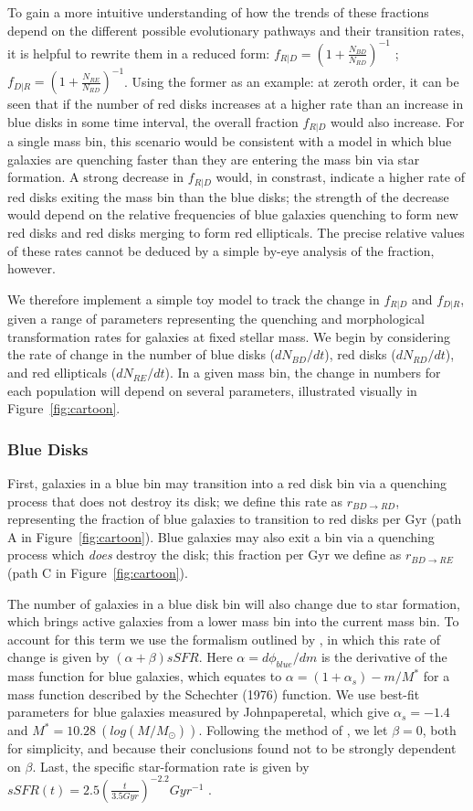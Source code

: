 \documentclass[useAMS,usenatbib]{mn2e}
\begin{document}
To gain a more intuitive understanding of how the trends of these fractions depend on the different possible evolutionary pathways and their transition rates, it is helpful to rewrite them in a reduced form: $f_{R|D} = ({1+\frac{N_{BD}}{N_{RD}}})^{-1}$ ; $f_{D|R} = ({1+\frac{N_{RE}}{N_{RD}}})^{-1}$. Using the former as an example: at zeroth order, it can be seen that if the number of red disks increases at a higher rate than an increase in blue disks in some time interval, the overall fraction $f_{R|D}$ would also increase. For a single mass bin, this scenario would be consistent with a model in which blue galaxies are quenching faster than they are entering the mass bin via star formation. A strong decrease in $f_{R|D}$ would, in constrast, indicate a higher rate of red disks exiting the mass bin than the blue disks; the strength of the decrease would depend on the relative frequencies of blue galaxies quenching to form new red disks and red disks merging to form red ellipticals. The precise relative values of these rates cannot be deduced by a simple by-eye analysis of the fraction, however.

We therefore implement a simple toy model to track the change in $f_{R|D}$ and $f_{D|R}$, given a range of parameters representing the quenching and morphological transformation rates for galaxies at fixed stellar mass. We begin by considering the rate of change in the number of blue disks ($dN_{BD}/dt$), red disks ($dN_{RD}/dt$), and red ellipticals ($dN_{RE}/dt$). In a given mass bin, the change in numbers for each population will depend on several parameters, illustrated visually in Figure~\ref{fig:cartoon}.

\subsubsection{Blue Disks}
First, galaxies in a blue bin may transition into a red disk bin via a quenching process that does not destroy its disk; we define this rate as $r_{BD \rightarrow RD}$, representing the fraction of blue galaxies to transition to red disks per Gyr (path A in Figure~\ref{fig:cartoon}). Blue galaxies may also exit a bin via a quenching process which \emph{does} destroy the disk; this fraction per Gyr we define as $r_{BD \rightarrow RE}$ (path C in Figure~\ref{fig:cartoon}).

The number of galaxies in a blue disk bin will also change due to star formation, which brings active galaxies from a lower mass bin into the current mass bin. To account for this term we use the formalism outlined by \citet{Peng2010}, in which this rate of change is given by $(\alpha + \beta)sSFR$. Here $\alpha = d\phi_{blue}/dm$ is the derivative of the mass function for blue galaxies, which equates to $\alpha = (1+\alpha_s) - m/M^*$ for a mass function described by the Schechter (1976) function. We use best-fit parameters for blue galaxies measured by Johnpaperetal, which give $\alpha_s = -1.4$ and $M^* = 10.28 ~(log(M/M_{\odot}))$. Following the method of \citet{Peng2010}, we let $\beta=0$, both for simplicity, and because their conclusions found not to be strongly dependent on $\beta$. Last, the specific star-formation rate is given by $sSFR(t) = 2.5(\frac{t}{3.5 Gyr})^{-2.2}Gyr^{-1}$ \citep{Peng2010}.
\end{document}
